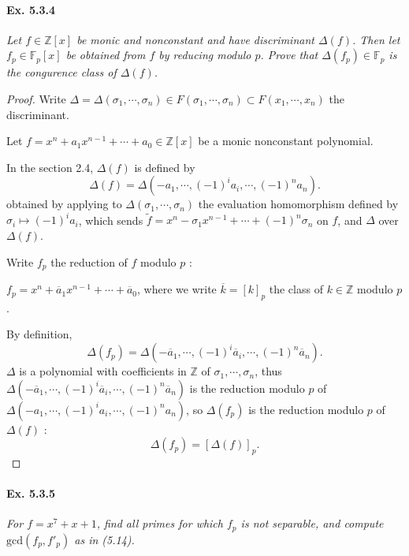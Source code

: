 \documentclass[11pt,a4paper]{article}
\newcommand{\Z}{\mathbb{Z}}
\newcommand{\F}{\mathbb{F}}
\begin{document}
\paragraph{Ex. 5.3.4}

{\it Let $f \in \Z[x]$ be monic and nonconstant and have discriminant $\Delta(f)$. Then let $f_p \in \F_p[x]$ be obtained from $f$ by reducing modulo $p$. Prove that $\Delta(f_p) \in \F_p$ is the congurence class of $\Delta(f)$.
}

\begin{proof}
Write $\Delta = \Delta(\sigma_1,\cdots,\sigma_n) \in F(\sigma_1,\cdots,\sigma_n) \subset F(x_1,\cdots,x_n)$ the discriminant.

Let $f =x^n + a_1 x^{n-1}+ \cdots+a_0 \in \Z[x]$ be a monic nonconstant polynomial.

In the section 2.4, $\Delta(f)$ is defined by 
$$\Delta(f) = \Delta(-a_1,\cdots,(-1)^i a_i, \cdots,(-1)^n a_n).$$
obtained by applying to $\Delta(\sigma_1,\cdots,\sigma_n)$ the evaluation homomorphism defined by $\sigma_i \mapsto (-1)^ia_i$, which sends $\tilde{f} = x^n-\sigma_1 x^{n-1}+\cdots+(-1)^n \sigma_n$ on $f$, and $\Delta$ over $\Delta(f)$.

Write $f_p$ the reduction of $f$ modulo $p$ : 

$f_p = x^n+\overline{a}_1x^{n-1}+\cdots+\overline{a}_0$, where we write $\overline{k} = [k]_p$ the class of $k \in \Z$ modulo $p$.

By definition, 
$$\Delta(f_p) = \Delta(-\overline{a}_1,\cdots,(-1)^i \overline{a}_i, \cdots,(-1)^n \overline{a}_n).$$
 $\Delta$ is a polynomial with coefficients in $\Z$ of $\sigma_1,\cdots,\sigma_n$, thus
$\Delta(-\overline{a}_1,\cdots,(-1)^i \overline{a}_i, \cdots,(-1)^n \overline {a}_n)$ is the reduction modulo $p$ of $\Delta(-a_1,\cdots,(-1)^i a_i, \cdots,(-1)^n a_n)$, so $\Delta(f_p)$ is the reduction modulo $p$ of $\Delta(f)$ : $$\Delta(f_p) = [\Delta(f)]_p.$$
\end{proof}

\paragraph{Ex. 5.3.5}

{\it For $f = x^7+x+1$, find all primes for which $f_p$ is not separable, and compute $\mathrm{gcd}(f_p,f'_p)$ as in (5.14).
}
\end{document}
